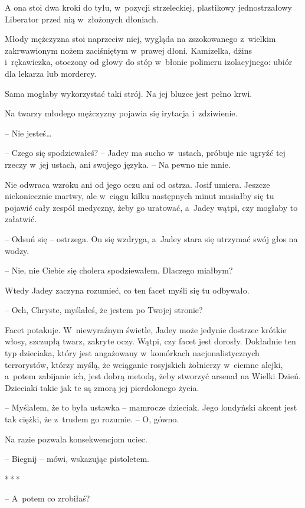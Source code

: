 \documentclass[oneside,polish,12pt,sfheadings]{mwbk}
\newcommand{\threeast}{\bigskip\par\centerline{*\,*\,*}\medskip\par}%
\begin{document}
A ona stoi dwa kroki do tyłu, w~pozycji strzeleckiej, plastikowy
jednostrzałowy Liberator przed nią w~złożonych dłoniach.

Młody mężczyzna stoi naprzeciw niej, wygląda na zszokowanego z~wielkim
zakrwawionym nożem zaciśniętym w~prawej dłoni. Kamizelka, dżins i~rękawiczka, otoczony od głowy do stóp w~błonie polimeru izolacyjnego:
ubiór dla lekarza lub mordercy.

Sama mogłaby wykorzystać taki strój. Na jej bluzce jest pełno krwi.

Na twarzy młodego mężczyzny pojawia się irytacja i~zdziwienie. 

-- Nie jesteś\ldots

-- Czego się spodziewałeś? -- Jadey ma sucho w~ustach, próbuje nie ugryźć
tej rzeczy w~jej ustach, ani swojego języka. -- Na pewno nie mnie.

Nie odwraca wzroku ani od jego oczu ani od ostrza. Josif umiera. Jeszcze
niekoniecznie martwy, ale w~ciągu kilku następnych minut musiałby się tu
pojawić cały zespół medyczny, żeby go uratować, a~Jadey wątpi, czy
mogłaby to załatwić.

-- Odsuń się -- ostrzega. On się wzdryga, a~Jadey stara się utrzymać swój
głos na wodzy. 

-- Nie, nie Ciebie się cholera spodziewałem. Dlaczego
miałbym?

Wtedy Jadey zaczyna rozumieć, co ten facet myśli się tu odbywało.

-- Och, Chryste, myślałeś, że jestem po Twojej stronie?

Facet potakuje. W~niewyraźnym świetle, Jadey może jedynie dostrzec
krótkie włosy, szczupłą twarz, zakryte oczy. Wątpi, czy facet jest
dorosły. Dokładnie ten typ dzieciaka, który jest angażowany w~komórkach
nacjonalistycznych terrorystów, którzy myślą, że wciąganie rosyjskich
żołnierzy w~ciemne alejki, a~potem zabijanie ich, jest dobrą metodą,
żeby stworzyć arsenał na Wielki Dzień. Dzieciaki takie jak te są zmorą
jej pierdolonego życia.

-- Myślałem, że to była ustawka -- mamrocze dzieciak. Jego londyński
akcent jest tak ciężki, że z~trudem go rozumie. -- O, gówno.

Na razie pozwala konsekwencjom uciec.

-- Biegnij -- mówi, wskazując pistoletem.

\threeast

-- A~potem co zrobiłaś?
\end{document}

